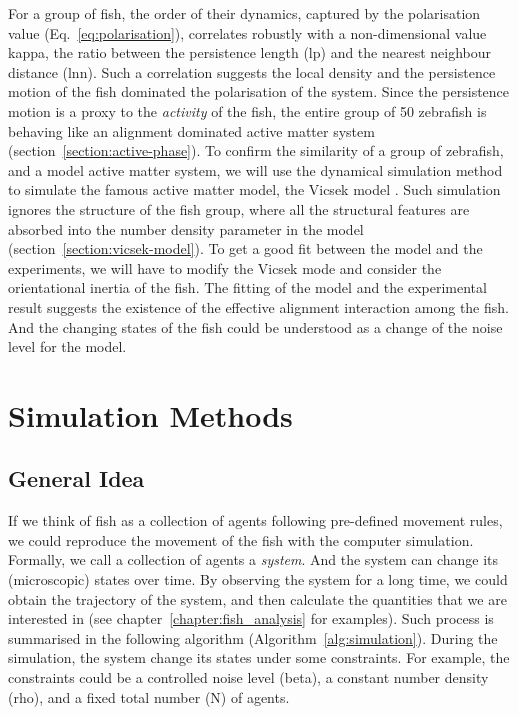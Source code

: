 \documentclass[11pt,twoside]{report}
\begin{document}
For a group of fish, the order of their dynamics, captured by the polarisation value (Eq.~\ref{eq:polarisation}), correlates robustly with a non-dimensional value \gls{kappa}, the ratio between the persistence length (\gls{lp}) and the nearest neighbour distance (\gls{lnn}).
Such a correlation suggests the local density and the persistence motion of the fish dominated the polarisation of the system.
Since the persistence motion is a proxy to the \emph{activity} of the fish, the entire group of 50 zebrafish is behaving like an alignment dominated active matter system (section~\ref{section:active-phase}).
To confirm the similarity of a group of zebrafish, and a model active matter system, we will use the dynamical simulation method to simulate the famous active matter model, the Vicsek model \cite{vicsek1995}.
Such simulation ignores the structure of the fish group, where all the structural features are absorbed into the number density parameter in the model (section~\ref{section:vicsek-model}).
To get a good fit between the model and the experiments, we will have to modify the Vicsek mode and consider the orientational inertia of the fish.
The fitting of the model and the experimental result suggests the existence of the effective alignment interaction among the fish. And the changing states of the fish could be understood as a change of the noise level for the model.


\section{Simulation Methods}


\subsection{General Idea}

If we think of fish as a collection of agents following pre-defined movement rules, we could reproduce the movement of the fish with the computer simulation. Formally, we call a collection of agents a \emph{system}. And the system can change its (microscopic) states over time.
By observing the system for a long time, we could obtain the trajectory of the system, and then calculate the quantities that we are interested in (see chapter~\ref{chapter:fish_analysis} for examples). Such process is summarised in the following algorithm (Algorithm~\ref{alg:simulation}).
During the simulation, the system change its states under some constraints. For example, the constraints could be a controlled noise level (\gls{beta}), a constant number density (\gls{rho}), and a fixed total number (\gls{N}) of agents.
\end{document}
